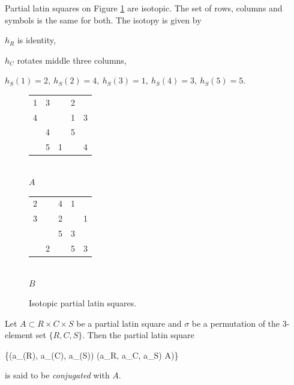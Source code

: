 \begin{exmp}
Partial latin squares on Figure \ref{fig:isotopic-pls} are isotopic. The set of rows, columns and symbols is the same for both. The isotopy is given by
\begin{cosyitemize}
	\item $h_R$ is identity,
	\item $h_C$ rotates middle three columns,
	\item $h_S(1) = 2,\ h_S(2) = 4,\ h_S(3) = 1,\ h_S(4) = 3,\ h_S(5) = 5$.
\end{cosyitemize}%

\begin{figure}[htb]
	\centering
	\begin{minipage}{.30\linewidth}
		\begin{center}
		\begin{tabular}{| c c c c c |}
			\hline
1 & 3 &   & 2 &   \\
4 &   &   & 1 & 3 \\
  & 4 &   & 5 &   \\
  & 5 & 1 &   & 4 \\
			\hline
		\end{tabular} \\
		\bigskip
		$A$
		\end{center}
	\end{minipage}
	\begin{minipage}{.30\linewidth}
		\begin{center}
		\begin{tabular}{| c c c c c |}
			\hline
2 &   & 4 & 1 &   \\
3 &   & 2 &   & 1 \\
  &   & 5 & 3 &   \\
  & 2 &   & 5 & 3 \\
			\hline
		\end{tabular} \\
		\bigskip
		$B$
		\end{center}
	\end{minipage}
	\caption{Isotopic partial latin squares.}
	\label{fig:isotopic-pls}
\end{figure}

\end{exmp}%

\begin{defn}
Let $A \subset R \times C \times S$ be a partial latin square and $\sigma$ be a permutation of the 3-element set $\{R,C,S\}$. Then the partial latin square
\begin{cosyeqnarray}
	\{(a_{\sigma(R)}, a_{\sigma(C)}, a_{\sigma(S)}) \mid (a_R, a_C, a_S) \in A)\}
\end{cosyeqnarray}
is said to be \emph{conjugated} with $A$.
\end{defn}


